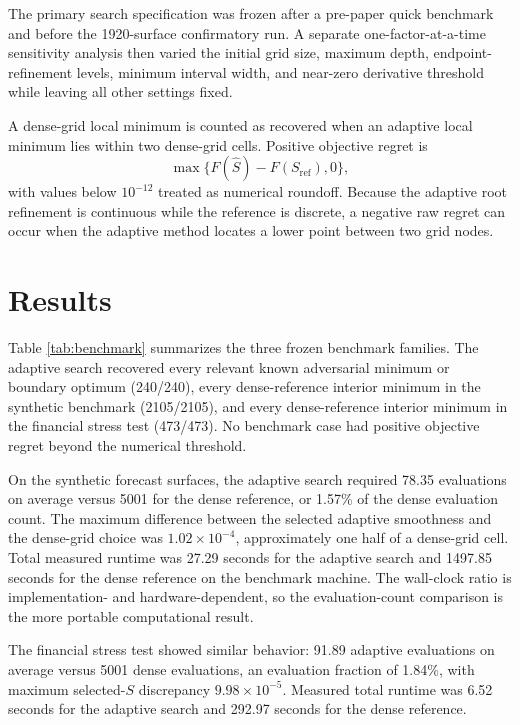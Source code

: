 \documentclass[english]{smcca}
\begin{document}
The primary search specification was frozen after a pre-paper quick benchmark and before the 1920-surface confirmatory run. A separate one-factor-at-a-time sensitivity analysis then varied the initial grid size, maximum depth, endpoint-refinement levels, minimum interval width, and near-zero derivative threshold while leaving all other settings fixed.

A dense-grid local minimum is counted as recovered when an adaptive local minimum lies within two dense-grid cells. Positive objective regret is
\[
\max\{F(\widehat S)-F(S_{\mathrm{ref}}),0\},
\]
with values below \(10^{-12}\) treated as numerical roundoff. Because the adaptive root refinement is continuous while the reference is discrete, a negative raw regret can occur when the adaptive method locates a lower point between two grid nodes.

\section{Results}

Table \ref{tab:benchmark} summarizes the three frozen benchmark families. The adaptive search recovered every relevant known adversarial minimum or boundary optimum (240/240), every dense-reference interior minimum in the synthetic benchmark (2105/2105), and every dense-reference interior minimum in the financial stress test (473/473). No benchmark case had positive objective regret beyond the numerical threshold.

\begin{table}[H]
\centering
\caption{Frozen benchmark summary. Evaluation fraction is the mean adaptive evaluation count divided by the corresponding dense-grid count.}
\label{tab:benchmark}
\resizebox{\textwidth}{!}{}
\end{table}

On the synthetic forecast surfaces, the adaptive search required 78.35 evaluations on average versus 5001 for the dense reference, or 1.57\% of the dense evaluation count. The maximum difference between the selected adaptive smoothness and the dense-grid choice was \(1.02\times10^{-4}\), approximately one half of a dense-grid cell. Total measured runtime was 27.29 seconds for the adaptive search and 1497.85 seconds for the dense reference on the benchmark machine. The wall-clock ratio is implementation- and hardware-dependent, so the evaluation-count comparison is the more portable computational result.

The financial stress test showed similar behavior: 91.89 adaptive evaluations on average versus 5001 dense evaluations, an evaluation fraction of 1.84\%, with maximum selected-\(S\) discrepancy \(9.98\times10^{-5}\). Measured total runtime was 6.52 seconds for the adaptive search and 292.97 seconds for the dense reference.
\end{document}
